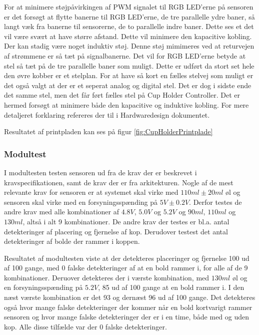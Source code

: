 \documentclass[Rapport/Rapport_main.tex]{subfiles}
\begin{document}
For at minimere støjpåvirkingen af PWM signalet til RGB LED'erne på sensoren er det forsøgt at flytte banerne til RGB LED'erne, de tre parallelle ydre baner, så langt væk fra banerne til sensorerne, de to parallelle indre baner. Dette ses et det vil være svært at have større afstand. Dette vil minimere den kapacitive kobling. Der kan stadig være noget induktiv støj. Denne støj mimimeres ved at returvejen af strømmene er så tæt på signalbanerne. Det vil for RGB LED'erne betyde at stel så tæt på de tre parallelle baner som muligt. Dette er udført da stort set hele den øvre kobber er et stelplan. For at have så kort en fælles stelvej som muligt er det også valgt at der er et seperat analog og digital stel. Det er dog i sidste ende det samme stel, men det får ført fælles stel på Cup Holder Controller.
Det er hermed forsøgt at minimere både den kapacitive og induktive kobling. For mere detaljeret forklaring refereres der til  i Hardwaredesign dokumentet.

Resultatet af printpladen kan ses på figur \ref{fig:CupHolderPrintplade}


\subsubsection{Modultest}
I modultesten testen sensoren ud fra de krav der er beskrevet i kravspecifikationen, samt de krav der er fra arkitekturen. Nogle af de mest relevante krav for sensoren er at systemet skal virke med $110\si{ml} \pm 20\si{ml}$ øl og sensoren skal virke med en forsyningsspænding på $5\si{V} \pm 0.2\si{V}$. Derfor testes de andre krav med alle kombinationer af $4.8\si{V}$, $5.0\si{V}$ og $5.2\si{V}$ og $90\si{ml}$, $110\si{ml}$ og $130\si{ml}$, altså i alt 9 kombinationer. De andre krav der testes er bl.a. antal detekteringer af placering og fjernelse af kop. Derudover testest det antal detekteringer af bolde der rammer i koppen.

Resultatet af modultesten viste at der detekteres placeringer og fjernelse 100 ud af 100 gange, med 0 falske detekteringer af at en bold rammer i, for alle af de 9 kombinationer. Deruover detekteres der i værste kombination, med $130\si{ml}$ øl og en forsyningsspænding på $5.2\si{V}$, 85 ud af 100 gange at en bold rammer i. I den næst værste kombination er det 93 og dernæst 96 ud af 100 gange. Det detekteres også hvor mange falske detekteringer der kommer når en bold kortvarigt rammer sensoren og hvor mange falske detekteringer der er i en time, både med og uden kop. Alle disse tilfælde var der 0 falske detekteringer.
\end{document}

